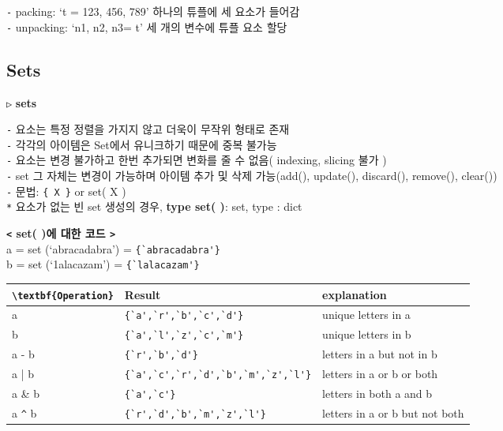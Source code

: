 \documentclass[11pt,a4paper]{article}
\begin{document}
\texttt{-} packing: `t = 123, 456, 789' 하나의 튜플에 세 요소가 들어감\\
\texttt{-} unpacking: `n1, n2, n3= t' 세 개의 변수에 튜플 요소 할당\\

\subsection{\Large\textbf{Sets}}
\texttt{▷} \textbf{sets}
\begin{spacing}{1.5}
\texttt{-} 요소는 특정 정렬을 가지지 않고 더욱이 무작위 형태로 존재\\
\texttt{-} 각각의 아이템은 Set에서 유니크하기 때문에 중복 불가능\\
\texttt{-} 요소는 변경 불가하고 한번 추가되면 변화를 줄 수 없음( indexing, slicing 불가 )\\
\texttt{-} set 그 자체는 변경이 가능하며 아이템 추가 및 삭제 가능(add(), update(), discard(), remove(), clear())\\
\texttt{-} 문법: \verb|{ X }| or set( X )\\
\hspace*{2em}\texttt{*} 요소가 없는 빈 set 생성의 경우, \textbf{type set( )}: set, type { }: dict\\
\end{spacing}
\textbf{\texttt{<} set( )에 대한 코드 \texttt{>}\\}
a = set (`abracadabra') = \verb|{`abracadabra'}|\\
b = set (`1alacazam') = \verb|{`lalacazam'}|\\
\begin{tabular}{|>{\centering\arraybackslash}m{4cm}|>{\centering\arraybackslash}m{6cm}|>{\centering\arraybackslash}m{6cm}|}
\hline
\rowcolors[gray]{0.9}
\verb|\textbf{Operation}| & \textbf{Result} & \textbf{explanation}\\
\hline
a & \verb|{`a',`r',`b',`c',`d'}| & unique letters in a\\
\hline
b & \verb|{`a',`l',`z',`c',`m'}| & unique letters in b\\
\hline
a - b & \verb|{`r',`b',`d'}| & letters in a but not in b\\
\hline
a | b & \verb|{`a',`c',`r',`d',`b',`m',`z',`l'}| & letters in a or b or both\\
\hline
a \& b & \verb|{`a',`c'}| & letters in both a and b\\
\hline
a \verb|^| b & \verb|{`r',`d',`b',`m',`z',`l'}| & letters in a or b but not both \\
\hline
\end{tabular}\\
\end{document}
